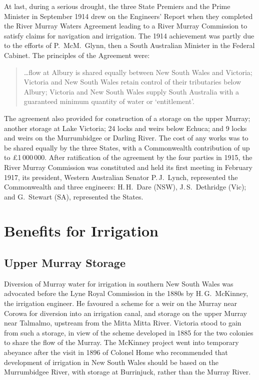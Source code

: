 At last, during a serious drought, the three State Premiers and the
Prime Minister in September 1914 drew on the Engineers' Report when
they completed the River Murray Waters Agreement leading to a River
Murray Commission to satisfy claims for navigation and irrigation. The
1914 achievement was partly due to the efforts of P.~McM.~Glynn, then
a South Australian Minister in the Federal Cabinet. The principles of the Agreement were:
\begin{quote}
	\ldots flow at Albury is shared equally between New South
	Wales and Victoria; Victoria and New South Wales retain
	control of their tributaries below Albury; Victoria and New
	South Wales supply South Australia with a guaranteed minimum
	quantity of water or `entitlement'.
\end{quote}

The agreement also provided for construction of a storage on the upper
Murray; another storage at Lake Victoria; 24 locks and weirs below
Echuca; and 9 locks and weirs on the Murrumbidgee or Darling River.
The cost of any works was to be shared equally by the three States,
with a Commonwealth contribution of up to \pounds1\,000\,000. After
ratification of the agreement by the four parties in 1915, the River
Murray Commission was constituted and held its first meeting in
February 1917, its president, Western Australian Senator P.\,J.~Lynch,
represented the Commonwealth and three engineers: H.\,H.~Dare (NSW),
J.\,S.~Dethridge (Vic); and G.~Stewart (SA), represented the
States.

\section*{Benefits for Irrigation}

\subsection*{Upper Murray Storage}

Diversion of Murray water for irrigation in southern New South Wales
was advocated before the Lyne Royal Commission in the 1880s by
H.\,G.~McKinney, the irrigation engineer.  He favoured a scheme for a
weir on the Murray near Corowa for diversion into an irrigation canal,
and storage on the upper Murray near Talmalmo, upstream from the Mitta
Mitta River.  Victoria stood to gain
from such a storage, in view of the scheme developed in 1885 for the
two colonies to share the flow of the Murray.  The McKinney project
went into temporary abeyance after the visit in 1896 of Colonel Home
who recommended that development of irrigation in New South Wales
should be based on the Murrumbidgee River, with storage at Burrinjuck,
rather than the Murray River.

